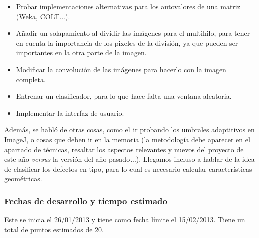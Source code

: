 \begin{itemize}
\item Probar implementaciones alternativas para los autovalores de una matriz (Weka, COLT...).
\item Añadir un solapamiento al dividir las imágenes para el multihilo, para tener en cuenta la importancia de los pixeles de la división, ya que pueden ser importantes en la otra parte de la imagen.
\item Modificar la convolución de las imágenes para hacerlo con la imagen completa.
\item Entrenar un clasificador, para lo que hace falta una ventana aleatoria.
\item Implementar la interfaz de usuario.
\end{itemize}

Además, se habló de otras cosas, como el ir probando los umbrales adaptitivos en ImageJ, o cosas que deben ir en la memoria (la metodología debe aparecer en el apartado de técnicas, resaltar los aspectos relevantes y nuevos del proyecto de este año \textit{versus} la versión del año pasado...). Llegamos incluso a hablar de la idea de clasificar los defectos en tipo, para lo cual es necesario calcular características geométricas.

\subsubsection*{Fechas de desarrollo y tiempo estimado}
Este \sprint{} se inicia el 26/01/2013 y tiene como fecha límite el 15/02/2013. Tiene un total de puntos estimados de 20.


